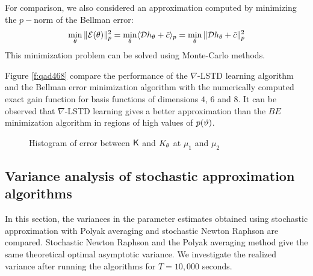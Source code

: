 For comparison, we also considered an approximation computed by minimizing the $p-$norm of the Bellman error:
\begin{align*}
\min_{\theta}\|{\cal E}(\theta)\|_{p}^{2}=\min_{\theta}\langle {\cal D} h_{\theta} + \tilde c \rangle_{p} = \min_{\theta}\|{\cal D} h_{\theta} +\tilde c \|_{p}^{2}
\end{align*}
This minimization problem can be solved using Monte-Carlo methods.

Figure \ref{f:qad468} compare the performance of the $\nabla$-LSTD learning algorithm and the Bellman error minimization algorithm with the numerically computed exact gain function for basis functions of dimensions $4$, $6$ and $8$. It can be observed that $\nabla$-LSTD learning gives a better approximation than the $BE$ minimization algorithm in regions of high values of $p(\vartheta)$.




%
%
%
%

\begin{figure}[h]
	\caption{ Histogram of error between $\text{\sf K}$ and $K_\theta$ at $\mu_{1}$ and $\mu_{2}$ }
	\label{var_snr_1}
	\vspace{-.15cm}
\end{figure}

\subsection{Variance analysis of stochastic approximation algorithms}
\label{asym_variance}
In this section, the variances in the parameter estimates obtained using stochastic approximation with Polyak averaging and stochastic Newton Raphson are compared. Stochastic Newton Raphson and the Polyak averaging method give the same theoretical optimal asymptotic variance. We investigate the realized variance after running the algorithms for $T=10,000$ seconds.

